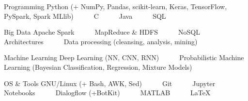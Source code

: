 

\begin{cvskills}

  \cvskill
    {Programming} %
    {Python (+ NumPy, Pandas, scikit-learn, Keras, TensorFlow, PySpark, Spark MLlib)~~~\textbullet~~~C~~~\textbullet~~~Java~~~\textbullet~~~SQL} %

  \cvskill
    {Big Data} %
    {Apache Spark~~~\textbullet~~~MapReduce \& HDFS~~~\textbullet~~~NoSQL Architectures~~~\textbullet~~~Data processing (cleansing, analysis, mining)} %

  \cvskill
    {Machine Learning} %
    {Deep Learning (NN, CNN, RNN)~~~\textbullet~~~Probabilistic Machine Learning (Bayesian Classification, Regression, Mixture Models)} %

  \cvskill
    {OS \& Tools} %
    {GNU/Linux (+ Bash, AWK, Sed)~~~\textbullet~~~Git~~~\textbullet~~~Jupyter Notebooks~~~\textbullet~~~Dialogflow (+BotKit)~~~\textbullet~~~MATLAB~~~\textbullet~~~LaTeX} %

\end{cvskills}
